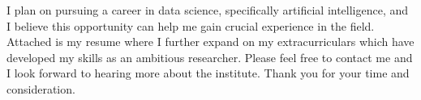


I plan on pursuing a career in data science, specifically artificial
intelligence, and I believe this opportunity can help me gain
crucial experience in the field. Attached is my resume where
I further expand on my extracurriculars which have 
developed my skills as an ambitious researcher. Please feel free 
to contact me and I look forward to hearing more about the institute. 
Thank you for your time and consideration.
